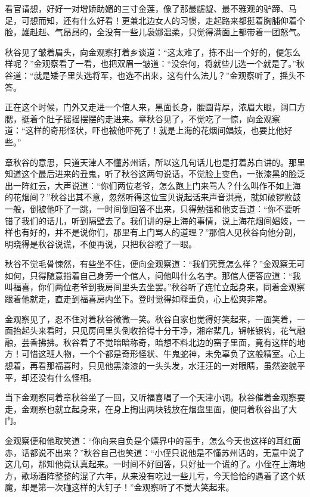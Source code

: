 \documentclass[12pt,UTF8]{ctexbook}
\begin{document}
{{{看官请想，好好一对增娇助媚的三寸金莲，像了那最龌龊、最不雅观的驴蹄、马足，可想而知，还有什么好看！更兼北边女人的习惯，走起路来都挺着胸脯仰着个脸，雄赳赳、气昂昂的，全没有一些儿袅娜温柔，只觉得满面上都带着一团怒气。

秋谷见了皱着眉头，向金观察打着乡谈道：“这太难了，拣不出一个好的，便怎么样呢？”金观察看了一看，也把双眉一皱道：“没奈何，将就些儿选一个就是了。”秋谷道：“就是矮子里头选将军，也选不出来，这有什么法儿？”金观察听了，摇头不答。

正在这个时候，门外又走进一个倌人来，黑面长身，腰圆背厚，浓眉大眼，阔口方腮，挺着个肚子摇摇摆摆的走进来。章秋谷见了，不觉吃了一惊，向金观察道：“这样的奇形怪状，吓也被他吓死了！就是上海的花烟间娼妓，也要比他好些。”

章秋谷的意思，只道天津人不懂苏州话，所以这几句话儿也是打着苏白讲的。那里知道这个最后进来的丑鬼，听了秋谷这两句说话，不觉脸上变色，一张漆黑的脸泛出一阵红云，大声说道：“你们两位老爷，怎么跑上门来骂人？什么叫作不如上海的花烟间？”秋谷出其不意，忽然听得这位宝贝说起话来声音洪亮，就如破锣败鼓一般，倒被他吓了一跳，一时间倒回答不出来，只得勉强和他支吾道：“你不要听错了我们的话儿，听到隔壁去了。我们讲的是上海的事情，说上海花烟间娼妓，一样也有好的，并不是说你们，那里有上门骂人的道理？”那倌人见秋谷向他分剖，明晓得是秋谷说谎，不便再说，只把秋谷瞪了一眼。

秋谷不觉毛骨悚然，有些坐不住，便向金观察道：“我们究竟怎么样？”金观察无可如何，只得随意指着自己身旁一个倌人，问他叫什么名字。那倌人便答应道：“我叫福喜，你们两位老爷到我房间里头去坐罢。”秋谷听了连忙立起身来，同着金观察跟着他就走，直走到福喜房内坐下。登时觉得如释重负，心上松爽非常。

金观察见了，忍不住对着秋谷微微一笑。秋谷自家也觉得好笑起来，一面笑着，一面抬起头来看时，只见房间里头倒收拾得十分干净，湘帘棐几，锦帐银钩，花气融融，芸香拂拂。秋谷看了不觉暗暗称奇，暗想不料北边的窑子里面，竟有这样的地方！可惜这班人物，一个个都是奇形怪状、牛鬼蛇神，未免辜负了这般精室。心上想着，再看那福喜时，只见他黑漆漆的一头头发，水汪汪的一对眼睛，虽然姿貌平平，却还没有什么怪相。

当下金观察同着章秋谷坐了一回，又听福喜唱了一个天津小调。秋谷催着金观察要走，金观察也就立起身来，在身上掏出两块钱放在烟盘里面，便同着秋谷出了大门。

金观察便和他取笑道：“你向来自负是个嫖界中的高手，怎么今天也这样的耳红面赤，话都说不出来？”秋谷自己也笑道：“小侄只说他是不懂苏州话的，无意中说了这几句，那知他竟认真起来。一时间不好回答，只好扯一个谎的了。小侄在上海地方，歌场酒阵整整的混了六年，从来没有吃过一些儿亏，今天恰恰的遇着了这个妖魔，却是第一次碰这样的大钉子！”金观察听了不觉大笑起来。

}}}
\end{document}
